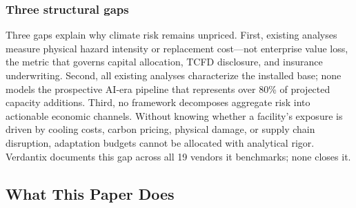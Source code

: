 \begin{twocolbody}

\subsubsection*{Three structural gaps}

Three gaps explain why climate risk remains unpriced. First, existing analyses measure physical hazard intensity or replacement cost---not enterprise value loss, the metric that governs capital allocation, TCFD disclosure, and insurance underwriting. Second, all existing analyses characterize the installed base; none models the prospective AI-era pipeline that represents over 80\% of projected capacity additions. Third, no framework decomposes aggregate risk into actionable economic channels. Without knowing whether a facility's exposure is driven by cooling costs, carbon pricing, physical damage, or supply chain disruption, adaptation budgets cannot be allocated with analytical rigor. Verdantix documents this gap across all 19 vendors it benchmarks; none closes it.

\end{twocolbody}

\vspace{4mm}
\subsection*{What This Paper Does}\label{toc:contrib}
\greensep

